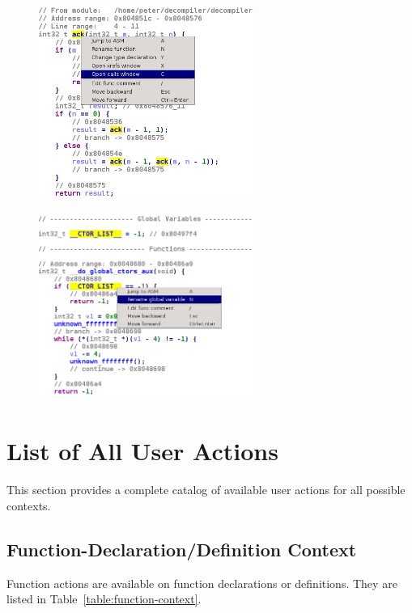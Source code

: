 \documentclass[pdftex, a4paper,12pt, oneside, svgnames]{article}
\begin{document}
\begin{figure}
\centering
\begin{minipage}{.5\textwidth}
	\centering
	\includegraphics[width=7cm]{figures/context-actions-1-cut}
	\label{fig:context-1}
\end{minipage}%
\begin{minipage}{.5\textwidth}
	\centering
	\includegraphics[width=7cm]{figures/context-actions-2-cut}
	\label{fig:context-2}
\end{minipage}
\end{figure}

\section{List of All User Actions}
\label{sec:all-interaction}
This section provides a complete catalog of available user actions for all possible contexts.

\subsection{Function-Declaration/Definition Context}
\label{sec:context-fnc-def}
Function actions are available on function declarations or definitions. They are listed in Table~\ref{table:function-context}.
\end{document}
